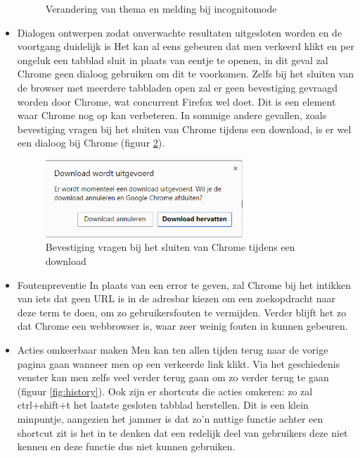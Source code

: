 \documentclass[12pt]{article}
\begin{document}
\begin{itemize}
\begin{figure}
		\caption{Verandering van thema en melding bij incognitomode}
		\label{fig:incognito}
	\end{figure}
	\item Dialogen ontwerpen zodat onverwachte resultaten uitgesloten worden en de voortgang duidelijk is
	\newline
	Het kan al eens gebeuren dat men verkeerd klikt en per ongeluk een tabblad sluit in plaats van eentje te openen, in dit geval zal Chrome geen dialoog gebruiken om dit te voorkomen. Zelfs bij het sluiten van de browser met meerdere tabbladen open zal er geen bevestiging gevraagd worden door Chrome, wat concurrent Firefox wel doet. Dit is een element waar Chrome nog op kan verbeteren. In sommige andere gevallen, zoals bevestiging vragen bij het sluiten van Chrome tijdens een download, is er wel een dialoog bij Chrome (figuur \ref{fig:dl}). 	
	\begin{figure}
		\centering
		\includegraphics[width=0.7\textwidth]{imgDownload.png}
		\caption{Bevestiging vragen bij het sluiten van Chrome tijdens een download}
		\label{fig:dl}
	\end{figure}
	\item Foutenpreventie
	\newline
	In plaats van een error te geven, zal Chrome bij het intikken van iets dat geen URL is in de adresbar kiezen om een zoekopdracht naar deze term te doen, om zo gebruikersfouten te vermijden. Verder blijft het zo dat Chrome een webbrowser is, waar zeer weinig fouten in kunnen gebeuren.
	\newpage
	\item Acties omkeerbaar maken
	\newline
	Men kan ten allen tijden terug naar de vorige pagina gaan wanneer men op een verkeerde link klikt. Via het geschiedenis venster kan men zelfs veel verder terug gaan om zo verder terug te gaan (figuur \ref{fig:history}). Ook zijn er shortcuts die acties omkeren: zo zal ctrl+shift+t het laatste gesloten tabblad herstellen. Dit is een klein minpuntje, aangezien het jammer is dat zo'n nuttige functie achter een shortcut zit is het in te denken dat een redelijk deel van gebruikers deze niet kennen en deze functie dus niet kunnen gebruiken.

\end{itemize}
\end{document}

